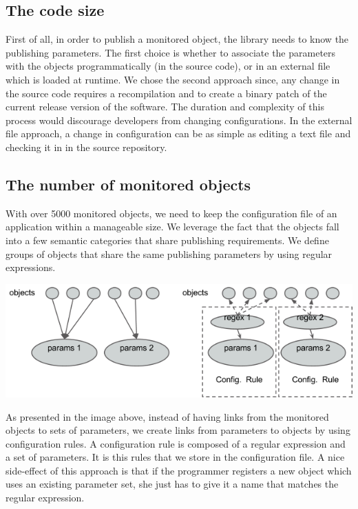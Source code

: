 \subsection*{The code size}

First of all, in order to publish a monitored object, the library needs to know the publishing parameters. The first choice is whether to associate the parameters with the objects programmatically (in the source code), or in an external file which is loaded at runtime. We chose the second approach since, any change in the source code requires a recompilation and to create a binary patch of the current release version of the software. The duration and complexity of this process would discourage developers from changing configurations. In the external file approach, a change in configuration can be as simple as editing a text file and checking it in in the source repository.

\subsection*{The number of monitored objects}

With over 5000 monitored objects, we need to keep the configuration file of an application within a manageable size. We leverage the fact that the objects fall into a few semantic categories that share publishing requirements. We define groups of objects that share the same publishing parameters by using regular expressions. 

\begin{center}
\includegraphics[scale=0.6]{Images/oks_regex.png}
\end{center}

As presented in the image above, instead of having links from the monitored objects to sets of parameters, we create links from parameters to objects by using configuration rules. A configuration rule is composed of a regular expression and a set of parameters. It is this rules that we store in the configuration file. A nice side-effect of this approach is that if the programmer registers a new object which uses an existing parameter set, she just has to give it a name that matches the regular expression.

